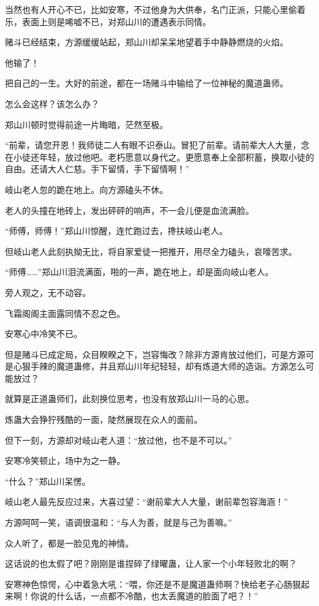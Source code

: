 \begin{this_body}
当然也有人开心不已，比如安寒，不过他身为大供奉，名门正派，只能心里偷着乐，表面上则是唏嘘不已，对郑山川的遭遇表示同情。

赌斗已经结束，方源缓缓站起，郑山川却呆呆地望着手中静静燃烧的火焰。

他输了！

把自己的一生。大好的前途，都在一场赌斗中输给了一位神秘的魔道蛊师。

怎么会这样？该怎么办？

郑山川顿时觉得前途一片晦暗，茫然至极。

“前辈，请您开恩！我师徒二人有眼不识泰山。冒犯了前辈。请前辈大人大量，念在小徒还年轻，放过他吧。老朽愿意以身代之。更愿意奉上全部积蓄，换取小徒的自由。还请大人仁慈。手下留情，手下留情啊！”

岐山老人忽的跪在地上。向方源磕头不休。

老人的头撞在地砖上，发出砰砰的响声，不一会儿便是血流满脸。

“师傅，师傅！”郑山川惊醒，连忙跑过去，搀扶岐山老人。

但岐山老人此刻执拗无比，将自家爱徒一把推开，用尽全力磕头，哀嚎苦求。

“师傅……”郑山川泪流满面，啪的一声，跪在地上，却是面向岐山老人。

旁人观之，无不动容。

飞霜阁阁主面露同情不忍之色。

安寒心中冷笑不已。

但是赌斗已成定局，众目睽睽之下，岂容悔改？除非方源肯放过他们，可是方源可是心狠手辣的魔道蛊修，并且郑山川年纪轻轻，却有炼道大师的造诣。方源怎么可能放过？

就算是正道蛊师们，此刻换位思考，也没有放郑山川一马的心思。

炼蛊大会狰狞残酷的一面，陡然展现在众人的面前。

但下一刻，方源却对岐山老人道：“放过他，也不是不可以。”

安寒冷笑顿止，场中为之一静。

“什么？”郑山川呆愣。

岐山老人最先反应过来，大喜过望：“谢前辈大人大量，谢前辈包容海涵！”

方源呵呵一笑，语调很温和：“与人为善，就是与己为善嘛。”

众人听了，都是一脸见鬼的神情。

这话说的也太假了吧？刚刚是谁捏碎了绿曜蛊，让人家一个小年轻败北的啊？

安寒神色惊愕，心中着急大吼：“喂，你还是不是魔道蛊师啊？快给老子心肠狠起来啊！你说的什么话，一点都不冷酷，也太丢魔道的脸面了吧？！”


\end{this_body}
